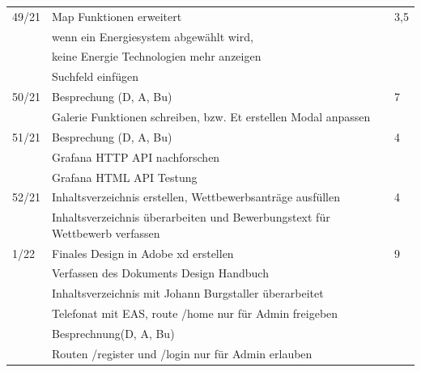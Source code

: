 \begin{table}[h]
\begin{tabular}{|l|l|l|}
	49/21 	&Map Funktionen erweitert & 3,5 \\
			&wenn ein Energiesystem abgewählt wird,  &\\
			&keine Energie Technologien mehr anzeigen&\\
			&Suchfeld einfügen&\\ \hline
	50/21 	&Besprechung (D, A, Bu)& 7 \\
			&Galerie Funktionen schreiben, bzw. Et erstellen Modal anpassen &\\ \hline
	51/21 	&Besprechung (D, A, Bu) & 4 \\
			&Grafana HTTP API nachforschen& \\
			&Grafana HTML API Testung & \\ \hline
	52/21	&Inhaltsverzeichnis erstellen, Wettbewerbsanträge ausfüllen & 4 \\
			&Inhaltsverzeichnis überarbeiten und Bewerbungstext für Wettbewerb verfassen&\\ \hline
	1/22	&Finales Design in Adobe xd erstellen& 9 \\
			&Verfassen des Dokuments Design Handbuch &\\
			&  Inhaltsverzeichnis mit Johann Burgstaller überarbeitet& \\
			&Telefonat mit EAS, route /home nur für Admin freigeben &\\
			& Besprechnung(D, A, Bu) &\\
			&Routen /register und /login nur für Admin erlauben&\\ \hline
			
	\end{tabular}
\end{table}
\newpage
